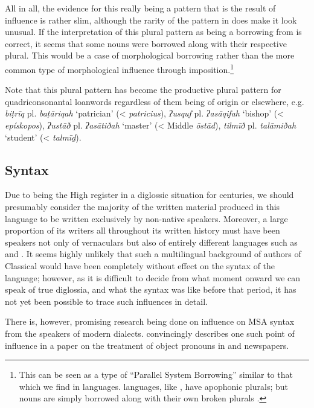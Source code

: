 \documentclass[output=paper]{langsci/langscibook}
\begin{document}
All in all, the evidence for this really being a pattern that is the result of  influence is rather slim, although the rarity of the pattern in  does make it look unusual. If the interpretation of this plural pattern as being a borrowing from  is correct, it seems that some  nouns were borrowed along with their respective plural. This would be a case of morphological borrowing rather than the more common type of morphological influence through {imposition}.\footnote{This can be seen as a type of “Parallel System Borrowing” similar to that which we find in  languages.  languages, like , have apophonic plurals; but  nouns are simply borrowed along with their own  broken plurals \citep{Kossmann2010}.} 

Note that this plural pattern has become the productive plural pattern for quadriconsonantal {loanwords} regardless of them being of  origin or elsewhere, e.g. \textit{biṭrīq} pl. \textit{baṭāriqah} ‘patrician’ (<  \textit{patricius}), \textit{ʔusquf} pl. \textit{ʔasāqifah} ‘bishop’ (<  \textit{epískopos}), \textit{ʔustāð} pl. \textit{ʔasātiðah} ‘master’ (< Middle  \textit{ōstād}), \textit{tilmīð} pl. \textit{talāmiðah} ‘student’ (<  \textit{talmīḏ}).

\subsection{\label{bkm:Ref13224809}Syntax}

Due to  being the High {register} in a diglossic situation for centuries, we should presumably consider the majority of the written material produced in this language to be written exclusively by non-native speakers. Moreover, a large proportion of its writers all throughout its written history must have been speakers not only of  vernaculars but also of entirely different languages such as  and . It seems highly unlikely that such a multilingual background of authors of Classical  would have been completely without effect on the syntax of the language; however, as it is difficult to decide from what moment onward we can speak of true {diglossia}, and what the syntax was like before that period, it has not yet been possible to trace such influences in detail.

There is, however, promising research being done on influence on MSA syntax from the speakers of modern  dialects. \citet{Wilmsen2010} convincingly describes one such point of influence in a paper on the treatment of object pronouns in  and  newspapers.
\end{document}
